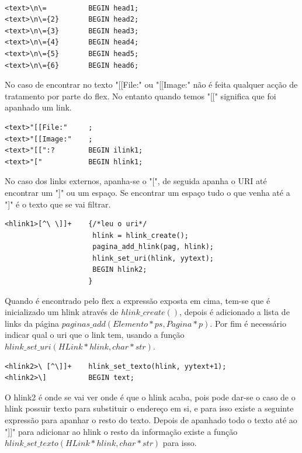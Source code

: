 \documentclass[11pt, a4paper, oneside]{article}
\begin{document}
\begin{verbatim}

<text>\n\=          BEGIN head1;
<text>\n\={2}       BEGIN head2;
<text>\n\={3}       BEGIN head3;
<text>\n\={4}       BEGIN head4;
<text>\n\={5}       BEGIN head5;
<text>\n\={6}       BEGIN head6;
\end{verbatim}

No caso de encontrar no texto "[[File:" ou "[[Image:" não é feita qualquer acção de tratamento por parte do flex. No entanto quando temos "[[" significa que foi apanhado um link.

\begin{verbatim}
<text>"[[File:"     ;
<text>"[[Image:"    ;
<text>"[[":?        BEGIN ilink1;
<text>"["           BEGIN hlink1;
\end{verbatim}

No caso dos links externos, apanha-se o "[", de seguida apanha o URI até encontrar um "]" ou um espaço. Se encontrar um espaço tudo o que venha até a "]"  é o texto que se vai filtrar.
\begin{verbatim}
<hlink1>[^\ \]]+    {/*leu o uri*/
                     hlink = hlink_create();
                     pagina_add_hlink(pag, hlink);
                     hlink_set_uri(hlink, yytext);
                     BEGIN hlink2;
                    }
\end{verbatim}

Quando é  encontrado pelo flex a expressão exposta em cima, tem-se que é inicializado um hlink através de \begin{math} hlink\_create() \end{math}, depois é adicionado a lista de links da página  \begin{math} paginas\_add(Elemento* ps, Pagina* p)\end{math}. Por fim  é necessário indicar qual o uri que o link tem, usando a função  \begin{math} hlink\_set\_uri(HLink* hlink, char* str)\end{math}.



\begin{verbatim}
<hlink2>\ [^\]]+    hlink_set_texto(hlink, yytext+1);
<hlink2>\]          BEGIN text;

\end{verbatim}

O hlink2 é onde se vai ver onde é que o hlink acaba, pois pode dar-se o caso de o hlink possuir texto para substituir o endereço em si, e para isso existe a seguinte expressão para apanhar o resto do texto. Depois de apanhado todo o texto até ao "]]" para adicionar ao hlink o resto da informação existe a função \begin{math} hlink\_set\_texto(HLink* hlink, char* str) \end{math} para isso.
\end{document}
